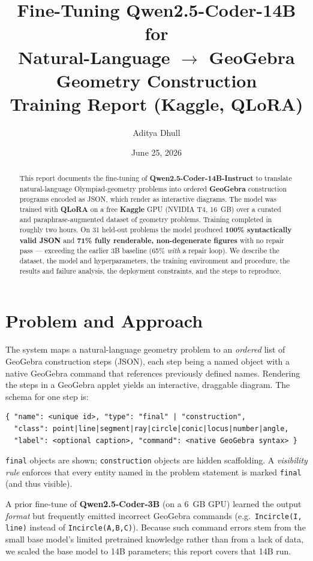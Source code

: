 \documentclass[11pt]{article}
\title{\textbf{Fine-Tuning Qwen2.5-Coder-14B for\\ Natural-Language $\rightarrow$ GeoGebra Geometry Construction}\\[4pt]
\large Training Report (Kaggle, QLoRA)}
\author{Aditya Dhull}
\date{June 25, 2026}
\newcommand{\code}[1]{\texttt{#1}}
\begin{document}
\maketitle

\begin{abstract}
This report documents the fine-tuning of \textbf{Qwen2.5-Coder-14B-Instruct} to translate
natural-language Olympiad-geometry problems into ordered \textbf{GeoGebra} construction
programs encoded as JSON, which render as interactive diagrams. The model was trained with
\textbf{QLoRA} on a free \textbf{Kaggle} GPU (NVIDIA T4, 16~GB) over a curated and
paraphrase-augmented dataset of geometry problems. Training completed in roughly two hours.
On 31 held-out problems the model produced \textbf{100\% syntactically valid JSON} and
\textbf{71\% fully renderable, non-degenerate figures} with no repair pass --- exceeding the
earlier 3B baseline (65\% \emph{with} a repair loop). We describe the dataset, the model and
hyperparameters, the training environment and procedure, the results and failure analysis,
the deployment constraints, and the steps to reproduce.
\end{abstract}

\section{Problem and Approach}
The system maps a natural-language geometry problem to an \emph{ordered} list of GeoGebra
construction steps (JSON), each step being a named object with a native GeoGebra command that
references previously defined names. Rendering the steps in a GeoGebra applet yields an
interactive, draggable diagram. The schema for one step is:

\begin{lstlisting}
{ "name": <unique id>, "type": "final" | "construction",
  "class": point|line|segment|ray|circle|conic|locus|number|angle,
  "label": <optional caption>, "command": <native GeoGebra syntax> }
\end{lstlisting}

\code{final} objects are shown; \code{construction} objects are hidden scaffolding. A
\emph{visibility rule} enforces that every entity named in the problem statement is marked
\code{final} (and thus visible).

A prior fine-tune of \textbf{Qwen2.5-Coder-3B} (on a 6~GB GPU) learned the output \emph{format}
but frequently emitted incorrect GeoGebra commands (e.g.\ \code{Incircle(I, line)} instead of
\code{Incircle(A,B,C)}). Because such command errors stem from the small base model's limited
pretrained knowledge rather than from a lack of data, we scaled the base model to 14B
parameters; this report covers that 14B run.
\end{document}
